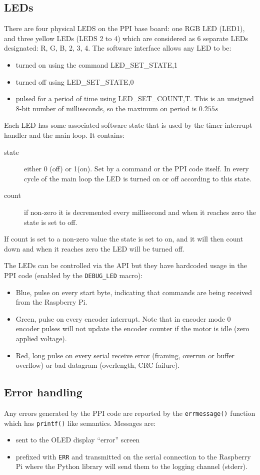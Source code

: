 \documentclass[11pt,fleqn]{article}
\begin{document}
\subsection{LEDs}\label{sec:leds}
There are four physical LEDS on the PPI base board: one RGB LED (LED1), and three yellow LEDs (LEDS 2 to 4) which are 
considered  as 6 separate LEDs designated: R, G, B, 2, 3, 4. 
The software interface allows any LED to be:
\begin{itemize}
\item turned on using the command LED\_SET\_STATE,1
\item turned off using LED\_SET\_STATE,0
\item pulsed for a period of time using LED\_SET\_COUNT,T. This is an unsigned 8-bit number of milliseconds, so the maximum on period is $0.255\unit{s}$
\end{itemize}

Each LED has some associated software state that is used by the timer interrupt handler and the main loop.  It contains:
\begin{description}
\item[state] either 0 (off) or 1(on).  Set by a command or the PPI code itself. In every cycle of the main loop the LED is
turned on or off according to this state.
\item[count] if non-zero it is decremented every millisecond and when it reaches zero the state is set to off.
\end{description}

If count is set to a non-zero value the state is set to on, and it will then count down and when it reaches zero the LED will be turned off.

The LEDs can be controlled via the API but they have hardcoded usage in the PPI code (enabled by the \texttt{DEBUG\_LED} macro):
\begin{itemize}
\item Blue, pulse on every start byte, indicating that commands are being received from the Raspberry Pi.
\item Green, pulse on every encoder interrupt.  Note that in encoder mode 0 encoder pulses will not update the encoder counter if the motor is idle (zero applied voltage).
\item Red, long pulse on every serial receive error (framing, overrun or buffer overflow) or bad datagram (overlength, CRC failure).
\end{itemize}

\subsection{Error handling}
Any errors generated by the PPI code are reported by the \texttt{errmessage()} function which has \texttt{printf()} like semantics.
Messages are:
\begin{itemize}
\item sent to  the OLED display ``error'' screen
\item prefixed with \texttt{ERR}  and transmitted on the serial connection to the Raspberry Pi where the Python library will send them 
to the logging channel (stderr).
\end{itemize}
\end{document}
